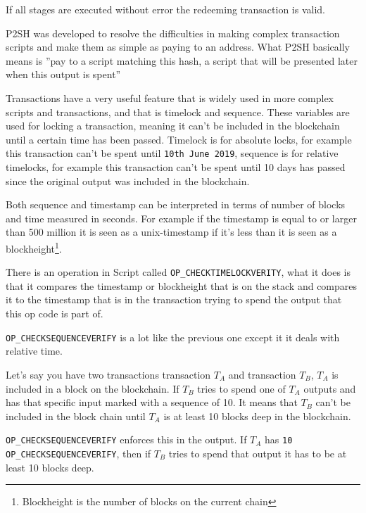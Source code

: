 If all stages are executed without error the redeeming transaction is valid. 

P2SH was developed to resolve the difficulties in making complex transaction scripts and make them as simple as paying to an address. What P2SH basically means is ''pay to a script matching this hash, a script that will be presented later when this output is spent''

Transactions have a very useful feature that is widely used in more complex scripts and transactions, and that is timelock and sequence. These variables are used for locking a transaction, meaning it can't be included in the blockchain until a certain time has been passed. Timelock is for absolute locks, for example this transaction can't be spent until \texttt{10th June 2019}, sequence is for relative timelocks, for example this transaction can't be spent until 10 days has passed since the original output was included in the blockchain.

Both sequence and timestamp can be interpreted in terms of number of blocks and time measured in seconds. For example if the timestamp is equal to or larger than 500 million it is seen as a unix-timestamp if it's less than it is seen as a blockheight\footnote{Blockheight is the number of blocks on the current chain}.

There is an operation in Script called \texttt{OP\_CHECKTIMELOCKVERITY}, what it does is that it compares the timestamp or blockheight that is on the stack and compares it to the timestamp that is in the transaction trying to spend the output that this op code is part of. 

\texttt{OP\_CHECKSEQUENCEVERIFY} is a lot like the previous one except it it deals with relative time. 

Let's say you have two transactions transaction $T_A$ and transaction $T_B$, $T_A$ is included in a block on the blockchain. If $T_B$ tries to spend one of $T_A$ outputs and has that specific input marked with a  sequence of 10. It means that $T_B$ can't be included in the block chain until $T_A$ is at least 10 blocks deep in the blockchain.

\texttt{OP\_CHECKSEQUENCEVERIFY} enforces this in the output. If $T_A$ has \texttt{10 OP\_CHECKSEQUENCEVERIFY}, then if $T_B$ tries to spend that output it has to be at least 10 blocks deep.
